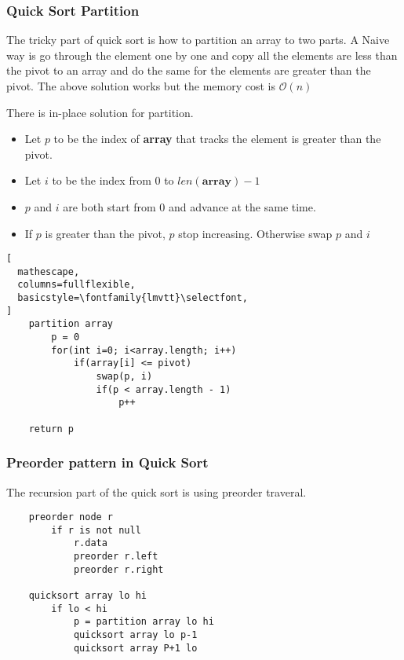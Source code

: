 \documentclass{article}
\begin{document}
\subsubsection{Quick Sort Partition}
The tricky part of quick sort is how to partition an array to two parts.
A Naive way is go through the element one by one and copy all the elements are less than the pivot to an array and do the same for the elements are greater than the pivot. 
The above solution works but the memory cost is $\mathcal{O}(n)$

There is in-place solution for partition. \\

\begin{minipage}{\linewidth}%
\end{minipage}

\begin{itemize}
\item Let $p$ to be the index of \textbf{array} that tracks the element is greater than the pivot. 
\item Let $i$ to be the index from $0$ to $len(\textbf{array})-1$ 
\item $p$ and $i$ are both start from $0$ and advance at the same time. 
\item If $p$ is greater than the pivot, $p$ stop increasing. Otherwise swap $p$ and $i$ 
\end{itemize}

\begin{lstlisting}[
  mathescape,
  columns=fullflexible,
  basicstyle=\fontfamily{lmvtt}\selectfont,
]
    partition array 
        p = 0
        for(int i=0; i<array.length; i++)
            if(array[i] <= pivot)
                swap(p, i)    
                if(p < array.length - 1)
                    p++

    return p
\end{lstlisting}

\pagebreak
\subsubsection{Preorder pattern in Quick Sort}
The recursion part of the quick sort is using preorder traveral.
\begin{verbatim}
    preorder node r
        if r is not null
            r.data
            preorder r.left
            preorder r.right

    quicksort array lo hi
        if lo < hi
            p = partition array lo hi
            quicksort array lo p-1
            quicksort array P+1 lo

\end{verbatim} 
\end{document}
